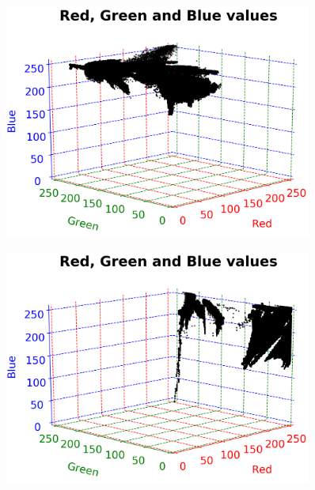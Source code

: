 \vspace{1mm}

\begin{figure}[H]
	\centering
	\begin{minipage}{0.5\textwidth}
		\centering
		\includegraphics[width=0.9\textwidth]{img/rgbBlue.png}
		\captionsetup{width=0.9\textwidth}
		\label{rgbBluePlot}
	\end{minipage}%
	\begin{minipage}{0.5\textwidth}
		\centering
		\includegraphics[width=0.9\textwidth]{img/rgbPink.png}
		\captionsetup{width=0.9\textwidth}
		\label{rgbPinkPlot}
	\end{minipage}
\end{figure}

